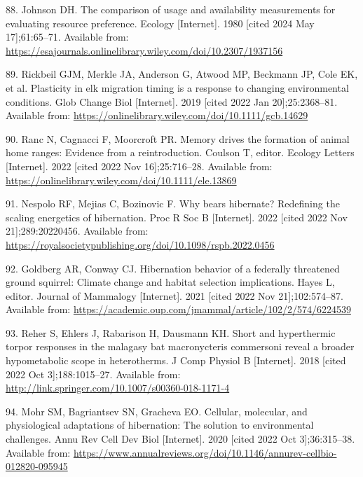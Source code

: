 \documentclass[
  12pt,
]{article}
\newlength{\cslhangindent}
\newenvironment{CSLReferences}[2] %
 {\begin{list}{}{%
  \setlength{\itemindent}{0pt}
  \setlength{\leftmargin}{0pt}
  \setlength{\parsep}{0pt}
  \ifodd #1
   \setlength{\leftmargin}{\cslhangindent}
   \setlength{\itemindent}{-1\cslhangindent}
  \fi
  \setlength{\itemsep}{#2\baselineskip}}}
 {\end{list}}
\begin{document}
\begin{CSLReferences}{0}{1}
88. Johnson DH. The comparison of usage and availability measurements for evaluating resource preference. Ecology {[}Internet{]}. 1980 {[}cited 2024 May 17{]};61:65--71. Available from: \url{https://esajournals.onlinelibrary.wiley.com/doi/10.2307/1937156}

89. Rickbeil GJM, Merkle JA, Anderson G, Atwood MP, Beckmann JP, Cole EK, et al. Plasticity in elk migration timing is a response to changing environmental conditions. Glob Change Biol {[}Internet{]}. 2019 {[}cited 2022 Jan 20{]};25:2368--81. Available from: \url{https://onlinelibrary.wiley.com/doi/10.1111/gcb.14629}

90. Ranc N, Cagnacci F, Moorcroft PR. Memory drives the formation of animal home ranges: Evidence from a reintroduction. Coulson T, editor. Ecology Letters {[}Internet{]}. 2022 {[}cited 2022 Nov 16{]};25:716--28. Available from: \url{https://onlinelibrary.wiley.com/doi/10.1111/ele.13869}

91. Nespolo RF, Mejias C, Bozinovic F. Why bears hibernate? Redefining the scaling energetics of hibernation. Proc R Soc B {[}Internet{]}. 2022 {[}cited 2022 Nov 21{]};289:20220456. Available from: \url{https://royalsocietypublishing.org/doi/10.1098/rspb.2022.0456}

92. Goldberg AR, Conway CJ. Hibernation behavior of a federally threatened ground squirrel: Climate change and habitat selection implications. Hayes L, editor. Journal of Mammalogy {[}Internet{]}. 2021 {[}cited 2022 Nov 21{]};102:574--87. Available from: \url{https://academic.oup.com/jmammal/article/102/2/574/6224539}

93. Reher S, Ehlers J, Rabarison H, Dausmann KH. Short and hyperthermic torpor responses in the malagasy bat macronycteris commersoni reveal a broader hypometabolic scope in heterotherms. J Comp Physiol B {[}Internet{]}. 2018 {[}cited 2022 Oct 3{]};188:1015--27. Available from: \url{http://link.springer.com/10.1007/s00360-018-1171-4}

94. Mohr SM, Bagriantsev SN, Gracheva EO. Cellular, molecular, and physiological adaptations of hibernation: The solution to environmental challenges. Annu Rev Cell Dev Biol {[}Internet{]}. 2020 {[}cited 2022 Oct 3{]};36:315--38. Available from: \url{https://www.annualreviews.org/doi/10.1146/annurev-cellbio-012820-095945}


\end{CSLReferences}
\end{document}
